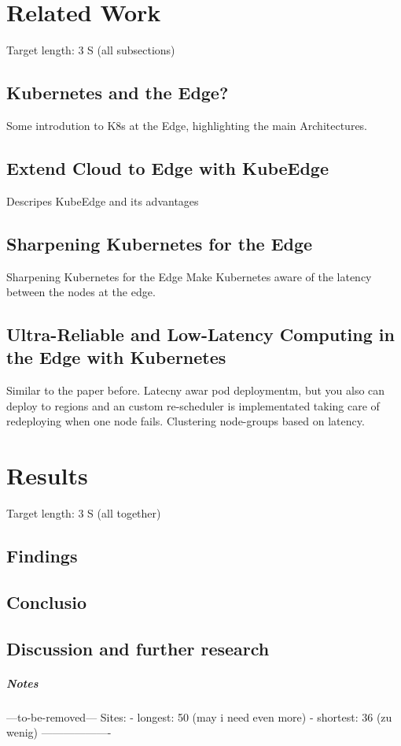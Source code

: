 \documentclass[MSC,Master,english]{twbook}%
\begin{document}
\chapter{Related Work}
\label{chap:related}
Target length: 3 S (all subsections)
\section{Kubernetes and the Edge?}
Some introdution to K8s at the Edge, highlighting the main Architectures.
\section{Extend Cloud to Edge with KubeEdge}
Descripes KubeEdge and its advantages
\section{Sharpening Kubernetes for the Edge}
Sharpening Kubernetes for the Edge
Make Kubernetes aware of the latency between the nodes at the edge.
\section{Ultra-Reliable and Low-Latency Computing in the Edge with Kubernetes}
Similar to the paper before. Latecny awar pod deploymentm, but you also can deploy to regions and an custom re-scheduler is implementated taking care of redeploying when one node fails.
Clustering node-groups based on latency.


\chapter{Results}
\label{chap:results}

Target length: 3 S (all together)
\section{Findings}
\label{sec:findings}

\section{Conclusio}
\label{sec:conclusio}

\section{Discussion and further research}
\label{sec:discuss}

\paragraph{Notes}
---to-be-removed---
Sites:
- longest: 50 (may i need even more)
- shortest: 36 (zu wenig)
-------------------
\end{document}
